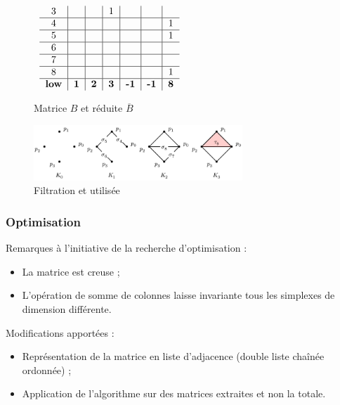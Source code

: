 \documentclass{beamer}
\begin{document}
\begin{frame}
\begin{figure}
\begin{math}
\begin{array}{cc}
\begin{tabular}{ c | c | c | c | c | c | c }
                3 &   &   & 1 &   &   &   \\ \hline
                4 &   &   &   &   &   & 1 \\ \hline
                5 &   &   &   &   &   & 1 \\ \hline
                6 &   &   &   &   &   &   \\ \hline
                7 &   &   &   &   &   &   \\ \hline
                8 &   &   &   &   &   & 1  \\ \hline
                \textbf{low} & \textbf{1} & \textbf{2} & \textbf{3} & 
                \textbf{-1} & \textbf{-1} & \textbf{8}
            \end{tabular}
        \end{array}
        \end{math}
        \caption{Matrice $B$ et réduite $\overline{B}$}
    \end{figure}
    \begin{figure}
        \includegraphics[width=0.7\textwidth]{../images/filtration_horizontal.png}
        \caption{Filtration et utilisée}
    \end{figure}
\end{frame}

\begin{frame}
    \frametitle{Optimisation}
    Remarques à l'initiative de la recherche d'optimisation :
    \begin{itemize}
        \item La matrice est creuse ;
        \item L'opération de somme de colonnes laisse invariante tous les simplexes de dimension différente.
    \end{itemize}

    Modifications apportées :
    \begin{itemize}
        \item Représentation de la matrice en liste d'adjacence (double liste chaînée ordonnée) ;
        \item Application de l'algorithme sur des matrices extraites et non la totale.
    \end{itemize}
\end{frame}
\end{document}
